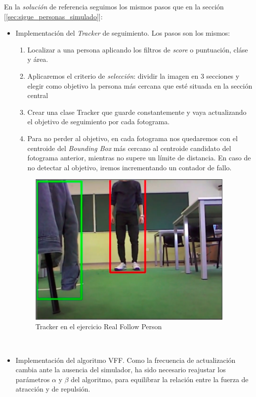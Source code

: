 En la \textit{solución} de referencia seguimos los mismos pasos que en la sección [\ref{sec:sigue_personas_simulado}]:
\begin{itemize}
	\item Implementación del \textit{Tracker} de seguimiento. Los pasos son los mismos:
	\begin{enumerate}
		\item Localizar a una persona aplicando los filtros de \textit{score} o puntuación, cláse y área.
		\item Aplicaremos el criterio de \textit{selección}: dividir la imagen en 3 secciones y elegir como objetivo la persona más cercana que esté situada en la sección central
		\item Crear una clase Tracker que guarde constantemente y vaya actualizando el objetivo de seguimiento por cada fotograma.
		\item Para no perder al objetivo, en cada fotograma nos quedaremos con el centroide del \textit{Bounding Box} más cercano al centroide candidato del fotograma anterior, mientras no supere un límite de distancia. En caso de no detectar al objetivo, iremos incrementando un contador de fallo.
	\end{enumerate}
	\begin{figure} [H]
		\begin{center}
			\includegraphics[width=10cm]{imagenes/cap6/tracker.png}
		\end{center}
		\caption[Tracker en el ejercicio Real Follow Person]{Tracker en el ejercicio Real Follow Person}
		\label{fig:tracker_real_follow_person}
	\end{figure}\
	
	\item Implementación del algoritmo VFF. Como la frecuencia de actualización cambia ante la ausencia del simulador, ha sido necesario reajustar los parámetros $\alpha$ y $\beta$ del algoritmo, para equilibrar la relación entre la fuerza de atracción y de repulsión.
	

\end{itemize}
